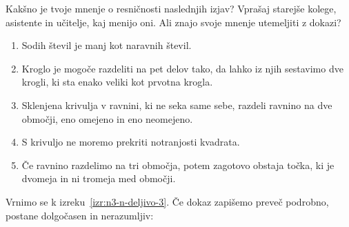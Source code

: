\begin{vaja}
  Kakšno je tvoje mnenje o resničnosti naslednjih izjav? Vprašaj
  starejše kolege, asistente in učitelje, kaj menijo oni. Ali znajo
  svoje mnenje utemeljiti z dokazi?
  \begin{enumerate}
  \item Sodih števil je manj kot naravnih števil.
  \item Kroglo je mogoče razdeliti na pet delov tako, da lahko iz njih
    sestavimo dve krogli, ki sta enako veliki kot prvotna krogla.
  \item Sklenjena krivulja v ravnini, ki ne seka same sebe, razdeli
    ravnino na dve območji, eno omejeno in eno neomejeno.
  \item S krivuljo ne moremo prekriti notranjosti kvadrata.
  \item Če ravnino razdelimo na tri območja, potem zagotovo obstaja
    točka, ki je dvomeja in ni tromeja med območji.
  \end{enumerate}
\end{vaja}

\noindent
%
Vrnimo se k izreku~\ref{izr:n3-n-deljivo-3}. Če dokaz zapišemo preveč
podrobno, postane dolgočasen in ne\-ra\-zumljiv:

